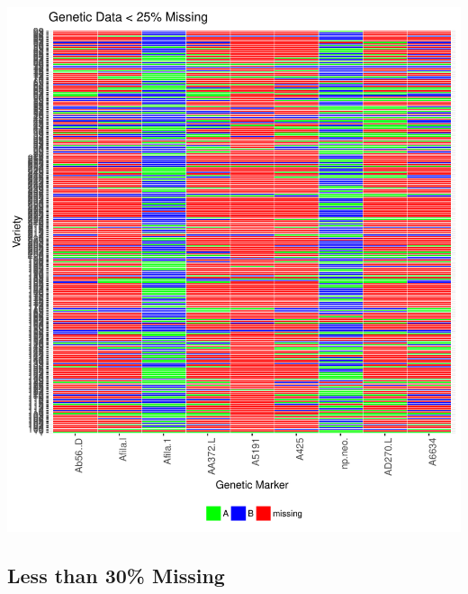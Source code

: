 \documentclass[11pt]{article}\usepackage[]{graphicx}\usepackage[]{color}
\makeatletter
\def\maxwidth{ %
  \ifdim\Gin@nat@width>\linewidth
    \linewidth
  \else
    \Gin@nat@width
  \fi
}
\newenvironment{knitrout}{}{} %
\makeatother
\begin{document}
\begin{knitrout}\footnotesize
{}\color{fgcolor}

{\centering \includegraphics[width=\maxwidth]{figure/missing_plot25-1} 

}



\end{knitrout}

\subsection{Less than 30\% Missing}
\end{document}
